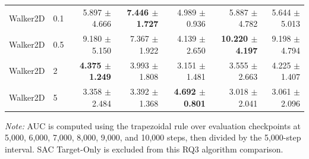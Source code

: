 \begin{table}[t]
\begin{tabular}{llrrrrr}
Walker2D & 0.1 & 5.897 $\pm$ 4.666 & \textbf{7.446 $\pm$ 1.727} & 4.989 $\pm$ 0.936 & 5.887 $\pm$ 4.782 & 5.644 $\pm$ 5.013 \\
Walker2D & 0.5 & 9.180 $\pm$ 5.150 & 7.367 $\pm$ 1.922 & 4.139 $\pm$ 2.650 & \textbf{10.220 $\pm$ 4.197} & 9.198 $\pm$ 4.794 \\
Walker2D & 2 & \textbf{4.375 $\pm$ 1.249} & 3.993 $\pm$ 1.808 & 3.151 $\pm$ 1.481 & 3.555 $\pm$ 2.663 & 4.225 $\pm$ 1.407 \\
Walker2D & 5 & 3.358 $\pm$ 2.484 & 3.392 $\pm$ 1.368 & \textbf{4.692 $\pm$ 0.801} & 3.018 $\pm$ 2.041 & 3.061 $\pm$ 2.096 \\
\bottomrule
\end{tabular}
\begin{minipage}{0.98\textwidth}
\footnotesize
\textit{Note:} AUC is computed using the trapezoidal rule over evaluation checkpoints at 5,000, 6,000, 7,000, 8,000, 9,000, and 10,000 steps, then divided by the 5,000-step interval. SAC Target-Only is excluded from this RQ3 algorithm comparison.
\end{minipage}
\end{table}